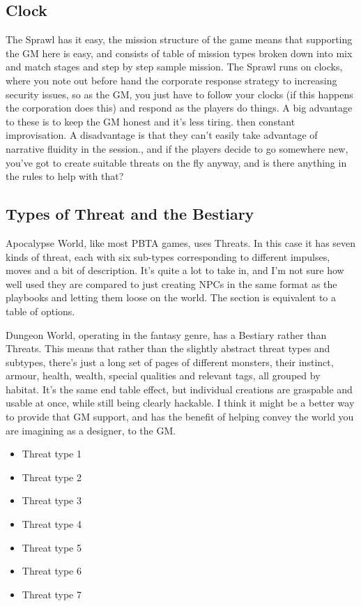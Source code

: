 \documentclass{tufte-handout}
\begin{document}
\subsection{Clock}
The Sprawl has it easy, the mission structure of the game means that supporting the GM here is easy, and consists of table of mission types broken down into mix and match stages and step by step sample mission. The Sprawl runs on clocks, where you note out before hand the corporate response strategy to increasing security issues, so as the GM, you just have to follow your clocks (if this happens the corporation does this) and respond as the players do things. A big advantage to these is to keep the GM honest and it's less tiring. then constant improvisation. A disadvantage is that they can't easily take advantage of narrative fluidity in the session., and if the players decide to go somewhere new, you've got to create suitable threats on the fly anyway, and is there anything in the rules to help with that?

\subsection{Types of Threat and the Bestiary }

Apocalypse World, like most PBTA games, uses Threats. In this case it has seven kinds of threat, each with six sub-types corresponding to different impulses, moves and a bit of description. It's quite a lot to take in, and I'm not sure how well used they are compared to just creating NPCs in the same format as the playbooks and letting them loose on the world. The section is equivalent to a table of options.

Dungeon World, operating in the fantasy genre, has a Bestiary rather than Threats. This means that rather than the slightly abstract threat types and subtypes, there's just a long set of pages of different monsters, their instinct, armour, health, wealth, special qualities and relevant tags, all grouped by habitat. It's the same end table effect, but individual creations are graspable and usable at once, while still being clearly hackable. I think it might be a better way to provide that GM support, and has the benefit of helping convey the world you are imagining as a designer, to the GM.


\begin{itemize}
\item Threat type 1
\item Threat type 2
\item Threat type 3
\item Threat type 4
\item Threat type 5
\item Threat type 6
\item Threat type 7
\end{itemize}
\end{document}
